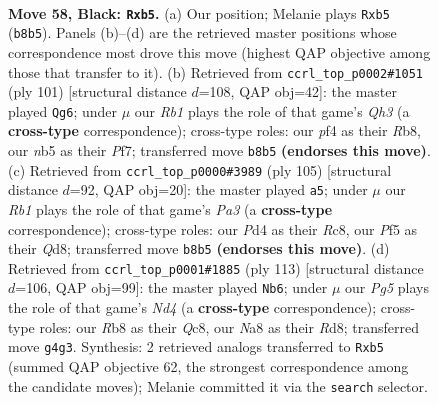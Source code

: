 \documentclass[11pt]{article}
\begin{document}
\clearpage

\begin{figure}[p]\centering
\begin{subfigure}{0.46\textwidth}\centering
\resizebox{\linewidth}{!}{%
\newchessgame
\chessboard[
  setfen={nr4k1/3qbr2/8/PNp2p1p/3p1Pp1/8/QR1BP2P/2RN2K1 b - - 0 58},
  showmover=false,
  pgfstyle=straightmove, color=movearrow, markmove={b8-b5}
]}
\caption{}
\end{subfigure}\hfill
\begin{subfigure}{0.46\textwidth}\centering
\resizebox{\linewidth}{!}{%
\newchessgame
\chessboard[
  setfen={1r6/2r2pk1/p2p3q/1p1Bp1p1/1P5b/P2R1P2/1KP4R/6Q1 b - - 2 51},
  showmover=false,
  pgfstyle=straightmove, color=movearrow, markmove={h6-g6}
]}
\caption{}
\end{subfigure}
\\[4pt]
\begin{subfigure}{0.46\textwidth}\centering
\resizebox{\linewidth}{!}{%
\newchessgame
\chessboard[
  setfen={2rq1bk1/1R5p/p1p1r1p1/3nBp1P/3Pp3/6P1/2R2PNK/2Q5 b - - 2 53},
  showmover=false,
  pgfstyle=straightmove, color=movearrow, markmove={a6-a5}
]}
\caption{}
\end{subfigure}\hfill
\begin{subfigure}{0.46\textwidth}\centering
\resizebox{\linewidth}{!}{%
\newchessgame
\chessboard[
  setfen={2qr2k1/1p2bp2/4p1pp/1PNn4/2RP2P1/6Q1/5P2/2R3K1 b - - 7 57},
  showmover=false,
  pgfstyle=straightmove, color=movearrow, markmove={d5-b6}
]}
\caption{}
\end{subfigure}
\caption{\textbf{Move 58, Black: \texttt{Rxb5}.} (a) Our position; Melanie plays \texttt{Rxb5} (\texttt{b8b5}). Panels (b)--(d) are the retrieved master positions whose correspondence most drove this move (highest QAP objective among those that transfer to it). (b) Retrieved from \texttt{ccrl\_top\_p0002\#1051} (ply 101) [structural distance $d$=108, QAP obj=42]: the master played \texttt{Qg6}; under $\mu$ our \emph{Rb1} plays the role of that game's \emph{Qh3} (a \textbf{cross-type} correspondence); cross-type roles: our \emph{p}f4 as their \emph{R}b8, our \emph{n}b5 as their \emph{P}f7; transferred move \texttt{b8b5} \textbf{(endorses this move)}. (c) Retrieved from \texttt{ccrl\_top\_p0000\#3989} (ply 105) [structural distance $d$=92, QAP obj=20]: the master played \texttt{a5}; under $\mu$ our \emph{Rb1} plays the role of that game's \emph{Pa3} (a \textbf{cross-type} correspondence); cross-type roles: our \emph{P}d4 as their \emph{R}c8, our \emph{P}f5 as their \emph{Q}d8; transferred move \texttt{b8b5} \textbf{(endorses this move)}. (d) Retrieved from \texttt{ccrl\_top\_p0001\#1885} (ply 113) [structural distance $d$=106, QAP obj=99]: the master played \texttt{Nb6}; under $\mu$ our \emph{Pg5} plays the role of that game's \emph{Nd4} (a \textbf{cross-type} correspondence); cross-type roles: our \emph{R}b8 as their \emph{Q}c8, our \emph{N}a8 as their \emph{R}d8; transferred move \texttt{g4g3}. Synthesis: 2 retrieved analogs transferred to \texttt{Rxb5} (summed QAP objective 62, the strongest correspondence among the candidate moves); Melanie committed it via the \texttt{search} selector.}
\label{fig:thought-m115}
\end{figure}
\end{document}
